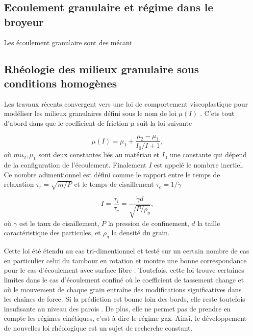 
\subsection{Ecoulement granulaire et régime dans le broyeur}
Les écoulement granulaire sont des mécani


\subsection{Rhéologie des milieux granulaire sous conditions homogènes}

Les travaux récents convergent vers une loi de comportement viscoplastique pour modéliser les milieux granulaires défini sous le nom de loi $\mu(I)$ \cite{gdr_midi_dense_2004,jop_constitutive_2006}.
C'ets tout d'abord dans \cite{POULIQUEN_FORTERRE_2002} que le coefficient de friction $\mu$ suit la loi suivante

\begin{equation*}
    \mu(I) = \mu_1 + \frac{\mu_2- \mu_1}{I_0/I + 1},
\end{equation*}où $mu_2, \mu_1$ sont deux constantes liés au matériau et $I_0$ une constante qui dépend de la configuration de l'écoulement. Finalement $I$ est appelé le nombrre inertiel. Ce nombre adimentionnel est défini comme le rapport entre le temps de relaxation $\tau_r = \sqrt{m/P}$ et le temps de cisaillement $\tau_c = 1 / \dot \gamma$

\begin{equation*}
    I = \frac{\tau_i}{\tau_c} = \frac{\dot \gamma d}{\sqrt{P/\rho_g}},
\end{equation*}où $\dot \gamma$ est le taux de cisaillement, $P$ la pression de confinement, $d$ la taille caractéristique des particules, et $\rho_g$ la densité du grain.

Cette loi été étendu au cas tri-dimentionnel et testé sur un certain nombre de cas en particulier celui du tambour en rotation \cite{Cortet_2009} et montre une bonne correspondance pour le cas d'écoulement avec surface libre \cite{chou_cross-sectional_2009}. Toutefois, cette loi trouve certaines limites dans le cas d'écoulement confiné où le coefficient de tassement change et où le mouvement de chaque grain entraîne des modifications significatives dans les chaînes de force. Si la prédiction est bonne loin des bords, elle reste toutefois insufisante au niveau des parois \cite{Rognon_Miller_Metzger_Einav_2015}.
De plus, elle ne permet pas de prendre en compte les régimes cinétiques, c'est à dire le régime gaz. Ainsi, le développement de nouvelles loi rhéologique est un sujet de recherche constant.

